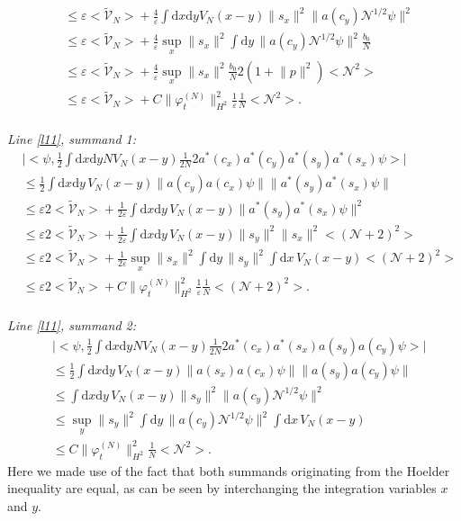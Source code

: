 \documentclass[11pt,a4paper,DIV11]{scrartcl}	%
\newcommand{\di}{\textrm{d}}		%
\newcommand{\Ncal}{\mathcal{N}}		%
\newcommand{\tilV}{\tilde{\mathcal{V}}_N}		%
\newcommand{\estlist}[2]{\emph{\vspace{.3em}\\Line \ref{l#1}, summand #2:}}
\newcommand{\scal}[2]{\big<#1,#2\big>} %
\newcommand{\norm}[1]{\lVert#1\rVert}	%
\newcommand{\ev}[1]{\big<#1\big>}	%
\newcommand{\ph}{\varphi_t^{(N)}}	%
\newcommand{\dxyNV}{\frac{1}{2}\int \di x\di y N V_N(x-y)} %
\begin{document}
\begin{fleqn}[0.5em]
\begin{align*}
& \leq \varepsilon \ev{\tilV} + \frac{4}{\varepsilon}\int \di x\di y V_N(x-y) \norm{s_x}^2 \norm{a(c_y)\Ncal^{1/2}\psi}^2 \\
& \leq \varepsilon \ev{\tilV} + \frac{4}{\varepsilon} \sup_x \norm{s_x}^2 \int \di y\, \norm{a(c_y)\Ncal^{1/2}\psi}^2 \frac{b_0}{N}\\
& \leq \varepsilon \ev{\tilV} + \frac{4}{\varepsilon} \sup_x \norm{s_x}^2 \frac{b_0}{N} 2 (1+\norm{p}^2)\ev{\Ncal^2} \\
& \leq \varepsilon \ev{\tilV} + C\norm{\ph}_{H^2}^2 \frac{1}{\varepsilon} \frac{1}{N}\ev{\Ncal^2}.
\end{align*}
\estlist{11}{1}
\begin{align*}
& \lvert \scal{\psi}{\dxyNV \frac{1}{2N}2a^\ast(c_x)a^\ast(c_y) a^\ast(s_y) a^\ast(s_x) \psi}\rvert \\
& \leq \frac{1}{2}\int \di x\di y\, V_N(x-y)  \norm{a(c_y)a(c_x)\psi} \norm{a^\ast(s_y)a^\ast(s_x)\psi} \\
& \leq \varepsilon 2 \ev{\tilV} + \frac{1}{2\varepsilon} \int \di x\di y\, V_N(x-y) \norm{a^\ast(s_y)a^\ast(s_x)\psi}^2 \\
& \leq \varepsilon 2 \ev{\tilV} + \frac{1}{2\varepsilon} \int \di x\di y\, V_N(x-y) \norm{s_y}^2 \norm{s_x}^2 \ev{(\Ncal+2)^2} \\
& \leq \varepsilon 2 \ev{\tilV} + \frac{1}{2\varepsilon} \sup_x \norm{s_x}^2 \int \di y\, \norm{s_y}^2 \int \di x\, V_N(x-y) \ev{(\Ncal+2)^2} \\
& \leq \varepsilon 2\ev{\tilV} + C\norm{\ph}_{H^2}^2 \frac{1}{\varepsilon} \frac{1}{N}\ev{(\Ncal+2)^2}.
\end{align*}
\estlist{11}{2}
\begin{align*}
& \lvert \scal{\psi}{\dxyNV \frac{1}{2N} 2 a^\ast(c_x) a^\ast(s_x) a(s_y) a(c_y)\psi}\rvert \\
& \leq \frac{1}{2}\int \di x\di y\, V_N(x-y) \norm{a(s_x) a(c_x) \psi} \norm{a(s_y) a(c_y)\psi} \\
& \leq \int \di x\di y\, V_N(x-y) \norm{s_y}^2 \norm{a(c_y) \Ncal^{1/2}\psi}^2\\
& \leq \sup_y \norm{s_y}^2 \int \di y\, \norm{a(c_y)\Ncal^{1/2}\psi}^2 \int \di x\, V_N(x-y)\\
& \leq C \norm{\ph}_{H^2}^2 \frac{1}{N}\ev{\Ncal^2}.
\end{align*}
Here we made use of the fact that both summands originating from the Hoelder inequality are equal, as can be seen by interchanging the integration variables $x$ and $y$.\newline

\end{fleqn}
\end{document}
